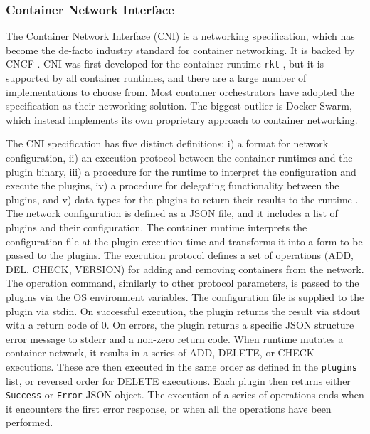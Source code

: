 \documentclass[english, 12pt, a4paper, sci, utf8, a-2b, online]{aaltothesis}
\begin{document}
\subsubsection{Container Network Interface} \label{cni}

The Container Network Interface (CNI) \cite{cni} is a networking specification, which has become the de-facto industry standard for container networking. It is backed by CNCF \cite{qi2020assessing}. CNI was first developed for the container runtime \texttt{rkt} \cite{hausenblas2018container}, but it is supported by all container runtimes, and there are a large number of implementations to choose from. Most container orchestrators have adopted the specification as their networking solution. The biggest outlier is Docker Swarm, which instead implements its own proprietary approach to container networking.

The CNI specification has five distinct definitions: i) a format for network configuration, ii) an execution protocol between the container runtimes and the plugin binary, iii) a procedure for the runtime to interpret the configuration and execute the plugins, iv) a procedure for delegating functionality between the plugins, and v) data types for the plugins to return their results to the runtime \cite{cni}. The network configuration is defined as a JSON file, and it includes a list of plugins and their configuration. The container runtime interprets the configuration file at the plugin execution time and transforms it into a form to be passed to the plugins. The execution protocol defines a set of operations (ADD, DEL, CHECK, VERSION) for adding and removing containers from the network. The operation command, similarly to other protocol parameters, is passed to the plugins via the OS environment variables. The configuration file is supplied to the plugin via stdin. On successful execution, the plugin returns the result via stdout with a return code of 0. On errors, the plugin returns a specific JSON structure error message to stderr and a non-zero return code. When runtime mutates a container network, it results in a series of ADD, DELETE, or CHECK executions. These are then executed in the same order as defined in the \texttt{plugins} list, or reversed order for DELETE executions. Each plugin then returns either \texttt{Success} or \texttt{Error} JSON object. The execution of a series of operations ends when it encounters the first error response, or when all the operations have been performed.

\end{document}
